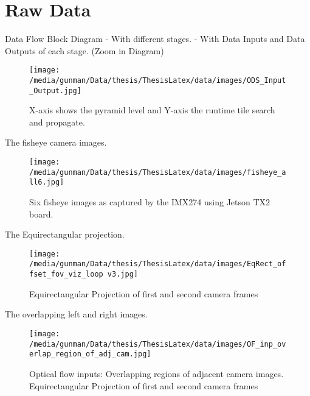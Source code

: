 \chapter{Raw Data}


Data Flow \newline
Block Diagram
- With different stages.
- With Data Inputs and Data Outputs of each stage. (Zoom in Diagram)

\begin{figure*}
	\begin{center}
		\texttt{[image: /media/gunman/Data/thesis/ThesisLatex/data/images/ODS\_Input\_Output.jpg]}
		\caption{X-axis shows the pyramid level and Y-axis the runtime tile search and propagate.}
		\label{ODS_Input_Output}
	\end{center}
	\vspace{-0.3in}
\end{figure*} 

The fisheye camera images.

\begin{figure*}
	\begin{center}
		\texttt{[image: /media/gunman/Data/thesis/ThesisLatex/data/images/fisheye\_all6.jpg]}
		\caption{Six fisheye images as captured by the IMX274 using Jetson TX2 board.}
		\label{ODS_Input_Output}
	\end{center}
	\vspace{-0.3in}
\end{figure*} 

The Equirectangular projection.

\begin{figure*}
	\begin{center}
		\texttt{[image: /media/gunman/Data/thesis/ThesisLatex/data/images/EqRect\_offset\_fov\_viz\_loop v3.jpg]}
		\caption{Equirectangular Projection of first and second camera frames}
		\label{ODS_Input_Ouput}
	\end{center}
	\vspace{-0.3in}
\end{figure*} 

The overlapping left and right images.
\begin{figure*}
	\begin{center}
		\texttt{[image: /media/gunman/Data/thesis/ThesisLatex/data/images/OF\_inp\_overlap\_region\_of\_adj\_cam.jpg]}
		\caption{Optical flow inputs: Overlapping regions of adjacent camera images. Equirectangular Projection of first and second camera frames}
		\label{ODS_Input_Ouput}
	\end{center}
	\vspace{-0.3in}
\end{figure*} 






